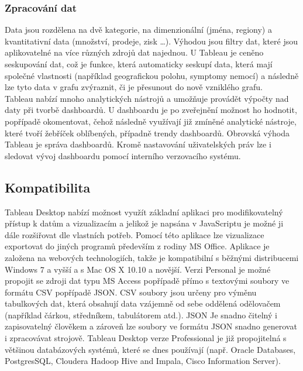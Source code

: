 \documentclass[czech,BP]{thesiskiv}
\begin{document}
 \subsubsection{Zpracování dat}
 Data jsou rozdělena na dvě kategorie, na dimenzionální (jména, regiony) a kvantitativní data (množství, prodeje, zisk …). Výhodou jsou filtry dat, které jsou aplikovatelné na více různých zdrojů dat najednou. U Tableau je ceněno seskupování dat, což je funkce, která automaticky seskupí data, která mají společné vlastnosti (například geografickou polohu, symptomy nemocí) a následně lze tyto data v grafu zvýraznit, či je přesunout do nově vzniklého grafu.\cite{TableauDimensions}
 \\
 Tableau nabízí mnoho analytických nástrojů a umožňuje provádět výpočty nad daty při tvorbě dashboardů. U dashboardu je po zveřejnění možnost ho hodnotit, popřípadě okomentovat, čehož následně využívají již zmíněné analytické nástroje, které tvoří žebříček oblíbených, případně trendy dashboardů. Obrovská výhoda Tableau je správa dashboardů. Kromě nastavování uživatelských práv lze i sledovat vývoj dashboardu pomocí interního verzovacího systému.\cite{TableauVersion}
  
 \subsection{Kompatibilita}
 Tableau Desktop nabízí možnost využít základní aplikaci pro modifikovatelný přístup k datům a vizualizacím a jelikož je napsána v JavaScriptu je možné ji dále rozšiřovat dle vlastních potřeb. Pomocí této aplikace lze vizualizace exportovat do jiných programů především z rodiny MS Office. Aplikace je založena na webových technologiích, takže je kompatibilní s běžnými distribucemi Windows 7 a vyšší a s Mac OS X 10.10 a novější. Verzi Personal je možné propojit se zdroji dat typu MS Access popřípadě přímo s textovými soubory ve formátu CSV popřípadě JSON. CSV soubory jsou určeny pro výměnu tabulkových dat, která obsahují data vzájemně od sebe oddělená odělovačem (například čárkou, středníkem, tabulátorem atd.). JSON \cite{JSON} Je snadno čitelný i zapisovatelný člověkem a zároveň lze soubory ve formátu JSON snadno generovat i zpracovávat strojově. Tableau Desktop verze Professional je již propojitelná s většinou databázových systémů, které se dnes používají (např. Oracle Databases, PostgresSQL, Cloudera Hadoop Hive and Impala, Cisco Information Server).\cite{TableauSources}
 
\end{document}
